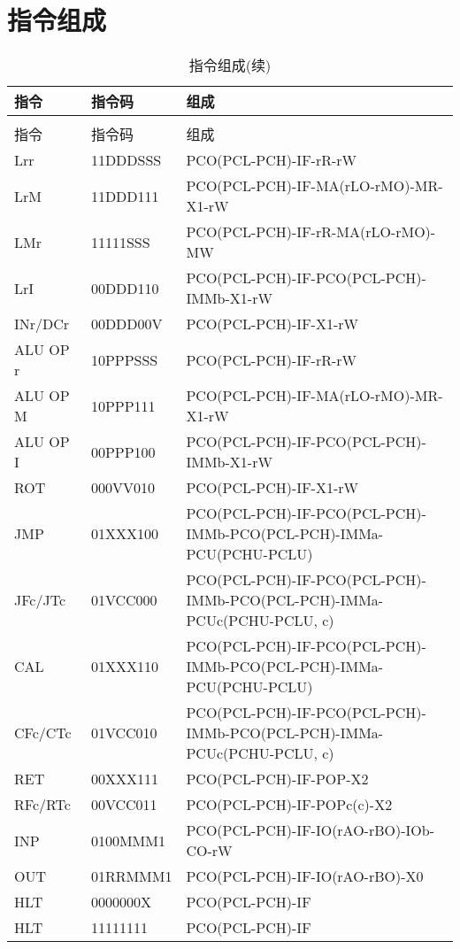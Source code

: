 \documentclass[10pt]{book}
\begin{document}
\section{指令组成}
\begin{landscape}
\begin{longtable}{|l|l|l|}
\caption{指令组成} \label{tb_ins_comb}\\
\hline
指令 & 指令码 & 组成 \\
\hline
\endfirsthead
\caption{指令组成(续)} \\
\hline
指令 & 指令码 & 组成 \\
\hline
\endhead
\hline
\endfoot
Lrr 			& 11DDDSSS & PCO(PCL-PCH)-IF-rR-rW \\
LrM				& 11DDD111 & PCO(PCL-PCH)-IF-MA(rLO-rMO)-MR-X1-rW \\
LMr				& 11111SSS & PCO(PCL-PCH)-IF-rR-MA(rLO-rMO)-MW \\
LrI				& 00DDD110 & PCO(PCL-PCH)-IF-PCO(PCL-PCH)-IMMb-X1-rW \\
\hline
INr/DCr			& 00DDD00V & PCO(PCL-PCH)-IF-X1-rW \\
\hline
ALU OP r		& 10PPPSSS & PCO(PCL-PCH)-IF-rR-rW \\
ALU OP M 		& 10PPP111 & PCO(PCL-PCH)-IF-MA(rLO-rMO)-MR-X1-rW \\
ALU OP I 		& 00PPP100 & PCO(PCL-PCH)-IF-PCO(PCL-PCH)-IMMb-X1-rW \\
ROT 			& 000VV010 & PCO(PCL-PCH)-IF-X1-rW \\
\hline
JMP				& 01XXX100 & PCO(PCL-PCH)-IF-PCO(PCL-PCH)-IMMb-PCO(PCL-PCH)-IMMa-PCU(PCHU-PCLU) \\
JFc/JTc			& 01VCC000 & PCO(PCL-PCH)-IF-PCO(PCL-PCH)-IMMb-PCO(PCL-PCH)-IMMa-PCUc(PCHU-PCLU, c) \\
CAL				& 01XXX110 & PCO(PCL-PCH)-IF-PCO(PCL-PCH)-IMMb-PCO(PCL-PCH)-IMMa-PCU(PCHU-PCLU) \\
CFc/CTc			& 01VCC010 & PCO(PCL-PCH)-IF-PCO(PCL-PCH)-IMMb-PCO(PCL-PCH)-IMMa-PCUc(PCHU-PCLU, c) \\
RET				& 00XXX111 & PCO(PCL-PCH)-IF-POP-X2 \\
RFc/RTc			& 00VCC011 & PCO(PCL-PCH)-IF-POPc(c)-X2 \\
\hline
INP				& 0100MMM1 & PCO(PCL-PCH)-IF-IO(rAO-rBO)-IOb-CO-rW \\
OUT				& 01RRMMM1 & PCO(PCL-PCH)-IF-IO(rAO-rBO)-X0 \\
\hline
HLT				& 0000000X & PCO(PCL-PCH)-IF \\
HLT				& 11111111 & PCO(PCL-PCH)-IF \\
\end{longtable}
\end{landscape}
\end{document}
